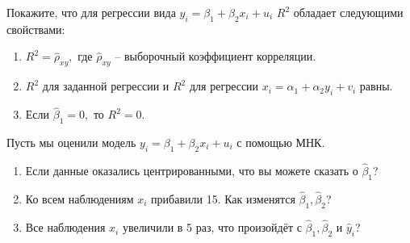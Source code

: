\documentclass[12pt]{article}
\newcommand{\hb}{\hat{\beta}}
\newcommand{\hy}{\hat{y}}
\begin{document}
\begin{problem}
    Покажите, что для регрессии вида $y_i = \beta_1 + \beta_2 x_i + u_i$ $R^2$ обладает следующими свойствами:

    \begin{enumerate}
    \item $R^2 = \hat{\rho}_{xy}, $ где $\hat{\rho}_{xy}$ -- выборочный коэффициент корреляции.

    \item $R^2$ для заданной регрессии и $R^2$ для регрессии $x_i = \alpha_1 + \alpha_2 y_i + v_i$ равны.

    \item Если $\hb_1 = 0,$ то $R^2 = 0.$    
    \end{enumerate}
    
\end{problem}

\begin{problem}
    Пусть мы оценили модель $y_i = \beta_1 + \beta_2 x_i + u_i$ с помощью МНК.

    \begin{enumerate}
    \item Если данные оказались центрированными, что вы можете сказать о $\hb_1$?
    \item Ко всем наблюдениям $x_i$ прибавили 15. Как изменятся $\hb_1, \hb_2$?
    \item Все наблюдения $x_i$ увеличили в 5 раз, что произойдёт с $\hb_1, \hb_2$ и $\hy_i$?
    \end{enumerate}
\end{problem}
\end{document}

